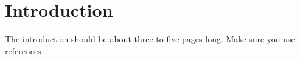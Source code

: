 
\chapter{Introduction}
The introduction should be about three to five pages long.
Make sure you use references~\cite{einstein}